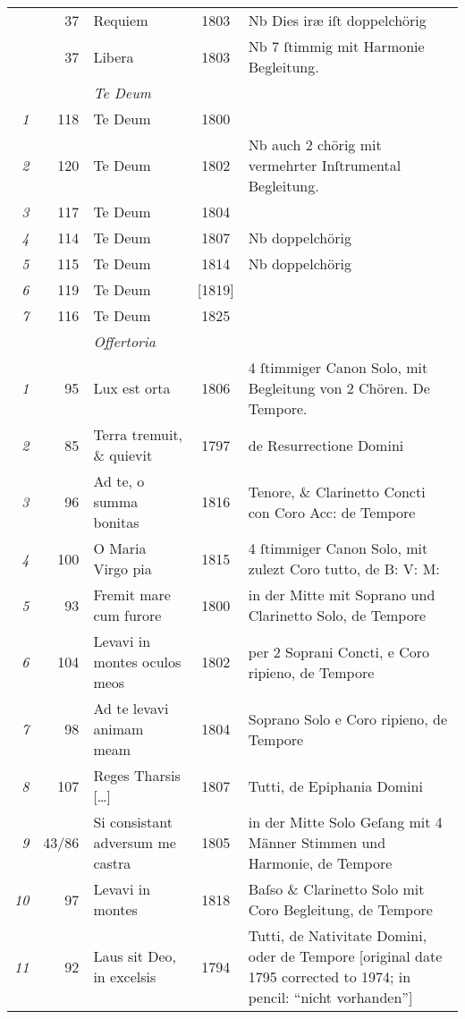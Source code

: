 \documentclass{ees}
\begin{document}
{\begin{xltabular}{\linewidth}{>{\itshape}rrlc X}
  \cmidrule(lr){3-3}
    & 37 & Requiem & 1803 & Nb Dies iræ iſt doppelchörig \\
    & 37 & Libera & 1803 & Nb 7 ſtimmig mit Harmonie Begleitung. \\
  \midrule
  & & \itshape Te Deum \\
  \cmidrule(lr){3-3}
  1 & 118 & Te Deum & 1800 &  \\
  2 & 120 & Te Deum & 1802 & Nb auch 2 chörig mit vermehrter Inſtrumental Begleitung. \\
  3 & 117 & Te Deum & 1804 &  \\
  4 & 114 & Te Deum & 1807 & Nb doppelchörig \\
  5 & 115 & Te Deum & 1814 & Nb doppelchörig \\
  6 & 119 & Te Deum & [1819] &  \\
  7 & 116 & Te Deum & 1825 &  \\
  \midrule
  & & \itshape Offertoria \\
  \cmidrule(lr){3-3}
  1  &  95 & Lux est orta & 1806 & 4 ſtimmiger Canon Solo, mit Begleitung von 2 Chören. De Tempore. \\
  2  &  85 & Terra tremuit, \& quievit & 1797 & de Resurrectione Domini \\
  3  &  96 & Ad te, o summa bonitas & 1816 & Tenore, \& Clarinetto Concti con Coro Acc: de Tempore \\
  4  & 100 & O Maria Virgo pia & 1815 & 4 ſtimmiger Canon Solo, mit zulezt Coro tutto, de B: V: M: \\
  5  &  93 & Fremit mare cum furore & 1800 & in der Mitte mit Soprano und Clarinetto Solo, de Tempore \\
  6  & 104 & Levavi in montes oculos meos & 1802 & per 2 Soprani Concti, e Coro ripieno, de Tempore \\
  7  &  98 & Ad te levavi animam meam & 1804 & Soprano Solo e Coro ripieno, de Tempore \\
  8  & 107 & Reges Tharsis […] & 1807 & Tutti, de Epiphania Domini \\
  9  &  43/86 & Si consistant adversum me castra & 1805 & in der Mitte Solo Geſang mit 4 Männer Stimmen und Harmonie, de Tempore \\
  10 &  97 & Levavi in montes & 1818 & Baſso \& Clarinetto Solo mit Coro Begleitung, de Tempore \\
  11 &  92 & Laus sit Deo, in excelsis & 1794 & Tutti, de Nativitate Domini, oder de Tempore [original date 1795 corrected to 1974; in pencil: “nicht vorhanden”] \\

\end{xltabular}}
\end{document}
